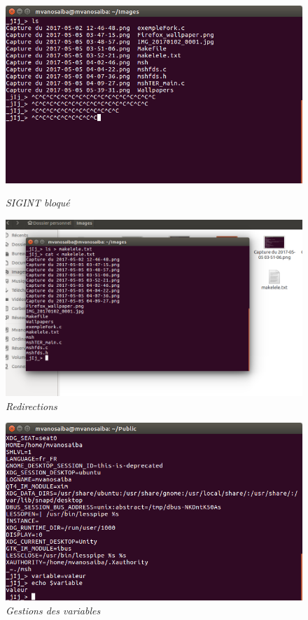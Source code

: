\begin{figure}[h!]
\begin{center}
\centering \includegraphics[scale=0.40]{figure/signal.png}
\caption{\it SIGINT bloqué}

\centering \includegraphics[scale=0.40]{figure/redi.png}
\caption{\it Redirections}

\end{center}
\end{figure}

\begin{figure}[h!]
\begin{center}

\centering \includegraphics[scale=0.50]{figure/Gest2.png}
\caption{\it Gestions des variables}

\end{center}
\end{figure}

